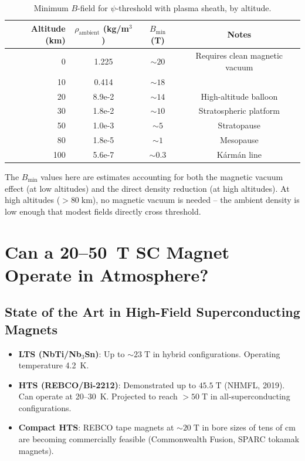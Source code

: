 \documentclass[11pt,a4paper]{article}
\begin{document}
\begin{table}[h]
\centering
\caption{Minimum $B$-field for $\psi$-threshold with plasma sheath, by altitude.}
\begin{tabular}{rSSS}
\toprule
{Altitude (km)} & {$\rho_{\mathrm{ambient}}$ (kg/m$^3$)} & {$B_{\mathrm{min}}$ (T)} & {Notes} \\
    & 1.225      & $\sim 20$  & {Requires clean magnetic vacuum} \\
10   & 0.414      & $\sim 18$  & {} \\
20   & 8.9e-2     & $\sim 14$  & {High-altitude balloon} \\
30   & 1.8e-2     & $\sim 10$  & {Stratospheric platform} \\
50   & 1.0e-3     & $\sim 5$   & {Stratopause} \\
80   & 1.8e-5     & $\sim 1$   & {Mesopause} \\
100  & 5.6e-7     & $\sim 0.3$ & {K\'arm\'an line} \\
\bottomrule
\end{tabular}
\end{table}

The $B_{\mathrm{min}}$ values here are estimates accounting for both the magnetic
vacuum effect (at low altitudes) and the direct density reduction (at high altitudes).
At high altitudes ($> 80\;\mathrm{km}$), no magnetic vacuum is needed -- the ambient
density is low enough that modest fields directly cross threshold.

\section{Can a 20--50~T SC Magnet Operate in Atmosphere?}\label{sec:SC}

\subsection{State of the Art in High-Field Superconducting Magnets}

\begin{itemize}
\item \textbf{LTS (NbTi/Nb$_3$Sn)}: Up to $\sim 23\;\mathrm{T}$ in
  hybrid configurations. Operating temperature 4.2~K.
\item \textbf{HTS (REBCO/Bi-2212)}: Demonstrated up to $45.5\;\mathrm{T}$
  (NHMFL, 2019). Can operate at 20--30~K. Projected to reach $>50\;\mathrm{T}$
  in all-superconducting configurations.
\item \textbf{Compact HTS}: REBCO tape magnets at $\sim 20\;\mathrm{T}$ in
  bore sizes of tens of cm are becoming commercially feasible (Commonwealth Fusion,
  SPARC tokamak magnets).
\end{itemize}
\end{document}
